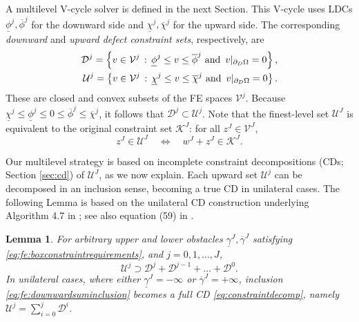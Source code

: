\documentclass[letterpaper,final,12pt,reqno]{amsart}
\theoremstyle{cstyle}
\newtheorem{lemma}[theorem]{Lemma}
\theoremstyle{cstyle*}
\theoremstyle{dstyle}
\numberwithin{equation}{section}
\numberwithin{figure}{section}
\numberwithin{table}{section}
\numberwithin{theorem}{section}
\begin{document}
A multilevel V-cycle solver is defined in the next Section.  This V-cycle uses LDCs $\underline{\phi}^j,\overline{\phi}^j$ for the downward side and $\underline{\chi}^j,\overline{\chi}^j$ for the upward side.  The corresponding \emph{downward} and \emph{upward defect constraint sets}, respectively, are
\begin{align}
\mathcal{D}^j = \left\{v \in \mathcal{V}^j \,:\, \underline{\phi}^j \le v \le \overline{\phi}^j \text{ and } \, v|_{\partial_D\Omega} = 0\right\}, \label{eq:fe:constraintsets} \\
\mathcal{U}^j = \left\{v \in \mathcal{V}^j \,:\, \underline{\chi}^j \le v \le \overline{\chi}^j \text{ and } \, v|_{\partial_D\Omega} = 0\right\}. \notag
\end{align}
These are closed and convex subsets of the FE spaces $\mathcal{V}^j$.  Because $\underline{\chi}^j \le \underline{\phi}^j \le 0 \le \overline{\phi}^j \le \overline{\chi}^j$, it follows that $\mathcal{D}^j \subset \mathcal{U}^j$.  Note that the finest-level set $\mathcal{U}^J$ is equivalent to the original constraint set $\mathcal{K}^J$: for all $z^J \in \mathcal{V}^J$,
\begin{equation}
z^J \in \mathcal{U}^J \quad \iff \quad w^J+z^J \in \mathcal{K}^J. \label{eq:fe:finestlevelequivalent}
\end{equation}

Our multilevel strategy is based on incomplete constraint decompositions (CDs; Section \ref{sec:cd}) of $\mathcal{U}^J$, as we now explain.  Each upward set $\mathcal{U}^j$ can be decomposed in an inclusion sense, becoming a true CD in unilateral cases.  The following Lemma is based on the unilateral CD construction underlying Algorithm 4.7 in \cite{GraeserKornhuber2009}; see also equation (59) in \cite{Tai2003}.

\begin{lemma}  \label{lem:downwardadmissibility}  For arbitrary upper and lower obstacles $\underline{\gamma}^J,\overline{\gamma}^J$ satisfying \eqref{eq:fe:boxconstraintrequirements}, and $j=0,1,\dots,J$,
\begin{equation}
\mathcal{U}^j \supset \mathcal{D}^j + \mathcal{D}^{j-1} + \dots + \mathcal{D}^0. \label{eq:fe:downwardsuminclusion}
\end{equation}
In unilateral cases, where either $\underline{\gamma}^J=-\infty$ or $\overline{\gamma}^J=+\infty$, inclusion \eqref{eq:fe:downwardsuminclusion} becomes a full CD \eqref{eq:constraintdecomp}, namely $\mathcal{U}^j=\sum_{i=0}^j \mathcal{D}^i$.
\end{lemma}
\end{document}
